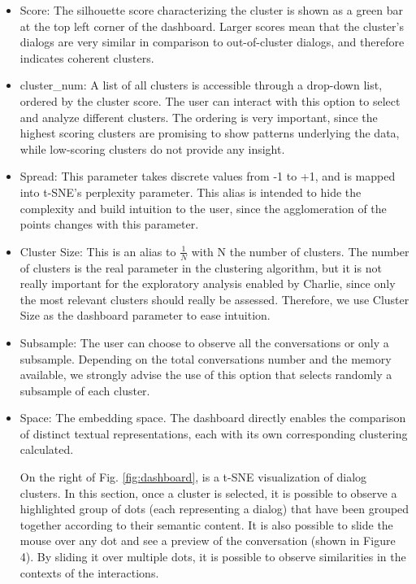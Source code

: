 \documentclass[11pt,a4paper]{article}
\begin{document}
\begin{itemize}
    \item Score: The silhouette score characterizing the cluster is shown as a green bar at the top left corner of the dashboard. Larger scores mean that the cluster's dialogs are very similar in comparison to out-of-cluster dialogs, and therefore indicates coherent clusters. 
    \item cluster\_num: A list of all clusters is accessible through a drop-down list, ordered by the cluster score. The user can interact with this option to select and analyze different clusters. The ordering is very important, since the highest scoring clusters are promising to show patterns underlying the data, while low-scoring clusters do not provide any insight.
    \item Spread: This parameter takes discrete values from -1 to +1, and is mapped into t-SNE's perplexity parameter. This alias is intended to hide the complexity and build intuition to the user, since the agglomeration of the points changes with this parameter.
    \item Cluster Size: This is an alias to $\frac{1}{N}$ with N the number of clusters. The number of clusters is the real parameter in the clustering algorithm, but it is not really important for the exploratory analysis enabled by Charlie, since only the most relevant clusters should really be assessed. Therefore, we use Cluster Size as the dashboard parameter to ease intuition.
    \item Subsample: The user can choose to observe all the conversations or only a subsample. Depending on the total conversations number and the memory available, we strongly advise the use of this option that selects randomly a subsample of each cluster.
    \item Space: The embedding space. The dashboard directly enables the comparison of distinct textual representations, each with its own corresponding clustering calculated.
    
    On the right of Fig. \ref{fig:dashboard}, is a t-SNE visualization of dialog clusters. In this section, once a cluster is selected, it is possible to observe a highlighted group of dots (each representing a dialog) that have been grouped together according to their semantic content. It is also possible to slide the mouse over any dot and see a preview of the conversation (shown in Figure 4). By sliding it over multiple dots, it is possible to observe similarities in the contexts of the interactions.
\end{itemize}
	
\end{document}
